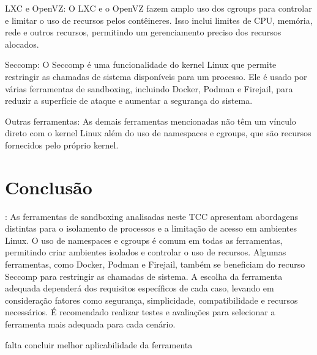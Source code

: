     LXC e OpenVZ: O LXC e o OpenVZ fazem amplo uso dos cgroups para controlar e limitar o uso de recursos pelos contêineres. Isso inclui limites de CPU, memória, rede e outros recursos, permitindo um gerenciamento preciso dos recursos alocados.

    Seccomp: O Seccomp é uma funcionalidade do kernel Linux que permite restringir as chamadas de sistema disponíveis para um processo. Ele é usado por várias ferramentas de sandboxing, incluindo Docker, Podman e Firejail, para reduzir a superfície de ataque e aumentar a segurança do sistema.

    Outras ferramentas: As demais ferramentas mencionadas não têm um vínculo direto com o kernel Linux além do uso de namespaces e cgroups, que são recursos fornecidos pelo próprio kernel.

\section{Conclusão}:
As ferramentas de sandboxing analisadas neste TCC apresentam abordagens distintas para o isolamento de processos e a limitação de acesso em ambientes Linux. O uso de namespaces e cgroups é comum em todas as ferramentas, permitindo criar ambientes isolados e controlar o uso de recursos. Algumas ferramentas, como Docker, Podman e Firejail, também se beneficiam do recurso Seccomp para restringir as chamadas de sistema. A escolha da ferramenta adequada dependerá dos requisitos específicos de cada caso, levando em consideração fatores como segurança, simplicidade, compatibilidade e recursos necessários. É recomendado realizar testes e avaliações para selecionar a ferramenta mais adequada para cada cenário.

falta concluir melhor aplicabilidade da ferramenta
